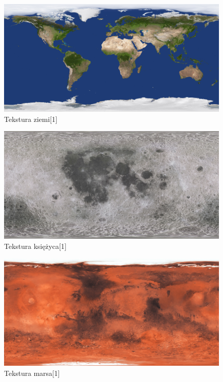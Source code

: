 \documentclass{article}
\begin{document}
        \FloatBarrier
        \begin{figure}[ht]
            \centering
            \includegraphics[width=\textwidth]{images/2k_earth_daymap.jpg}
            \caption{Tekstura ziemi[1]}
            \label{fig:earth}
        \end{figure}
        \FloatBarrier
        \begin{figure}[ht]
            \centering
            \includegraphics[width=\textwidth]{images/2k_moon.jpg}
            \caption{Tekstura księżyca[1]}
            \label{fig:moon}
        \end{figure}
        \FloatBarrier
        \begin{figure}[ht]
            \centering
            \includegraphics[width=\textwidth]{images/2k_mars.jpg}
            \caption{Tekstura marsa[1]}
            \label{fig:mars}
        \end{figure}
\end{document}
